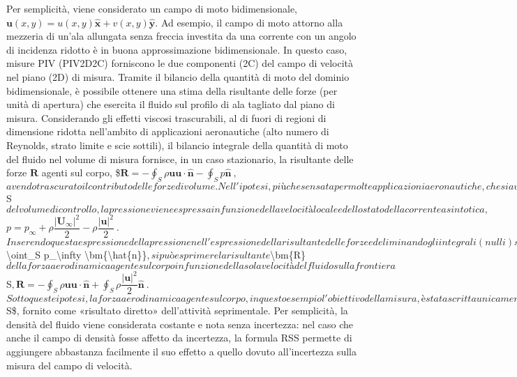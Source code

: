 \documentclass[letterpaper,10pt,italian]{jupyterBook}
\begin{document}
\sphinxAtStartPar
Per semplicità, viene considerato un campo di moto bidimensionale,
\(\bm{u}(x,y)=u(x,y)\bm{\hat{x}}+v(x,y)\bm{\hat{y}}\). Ad esempio, il
campo di moto attorno alla mezzeria di un’ala allungata senza freccia
investita da una corrente con un angolo di incidenza ridotto è in buona
approssimazione bidimensionale. In questo caso, misure PIV (PIV\sphinxhyphen{}2D\sphinxhyphen{}2C)
forniscono le due componenti (2C) del campo di velocità nel piano (2D)
di misura. Tramite il bilancio della quantità di moto del dominio
bidimensionale, è possibile ottenere una stima della risultante delle
forze (per unità di apertura) che esercita il fluido sul profilo di ala
tagliato dal piano di misura. Considerando gli effetti viscosi
trascurabili, al di fuori di regioni di dimensione ridotta nell’ambito
di applicazioni aeronautiche (alto numero di Reynolds, strato limite e
scie sottili), il bilancio integrale della quantità di moto del fluido
nel volume di misura fornisce, in un caso stazionario, la risultante
delle forze \({\bm{R}}\) agenti sul corpo,
\$\(\bm{R} = -\oint_S \rho \bm{u} \bm{u} \cdot \bm{\hat{n}} - \oint_S p \bm{\hat{n}} \ ,\)\(
avendo trascurato il contributo delle forze di volume. Nell'ipotesi, più
che sensata per molte applicazioni aeronautiche, che sia valido il
teorema di Bernoulli sulla frontiera \)S\( del volume di controllo, la
pressione viene espressa in funzione della velocità locale e dello stato
della corrente asintotica,
\)\(p = p_\infty + \rho \dfrac{|\bm{U_\infty}|^2}{2} - \rho \dfrac{|\bm{u}|^2}{2} \ .\)\(
Inserendo questa espressione della pressione nell'espressione della
risultante delle forze ed eliminando gli integrali (nulli) su una
superficie chiusa delle quantità costanti moltiplicate per la normale
alla superficie, come ad esempio \)\textbackslash{}oint\_S p\_\textbackslash{}infty \textbackslash{}bm\{\textbackslash{}hat\{n\}\}\(, si può
esprimere la risultante \)\textbackslash{}bm\{R\}\( della forza aerodinamica agente sul
corpo in funzione della sola velocità del fluido sulla frontiera \)S\(,
\)\(\bm{R} = -\oint_S \rho \bm{u} \bm{u} \cdot \bm{\hat{n}} + \oint_S \rho \dfrac{|\bm{u}|^2}{2} \bm{\hat{n}} \ .\)\(
Sotto queste ipotesi, la forza aerodinamica agente sul corpo, in questo
esempio l'obiettivo della misura, è stata scritta unicamente come
funzione del campo di velocità sulla superficie \)S\$, fornito come
«risultato diretto» dell’attività seprimentale. Per semplicità, la
densità del fluido viene considerata costante e nota senza incertezza:
nel caso che anche il campo di densità fosse affetto da incertezza, la
formula RSS permette di aggiungere abbastanza facilmente il suo effetto
a quello dovuto all’incertezza sulla misura del campo di velocità.
\end{document}

